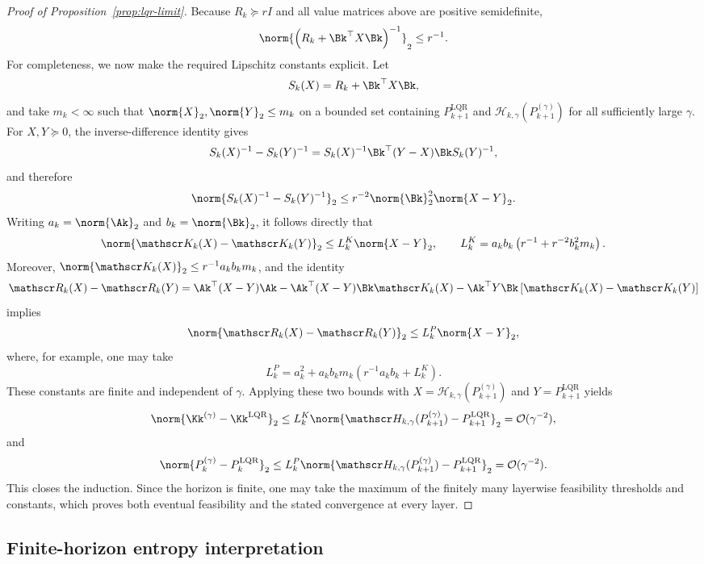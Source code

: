 \begin{proof}[Proof of Proposition~\ref{prop:lqr-limit}]
Because $R_k\succeq rI$ and all value matrices above are positive
semidefinite,
$$
\norm{
\left(R_k+\Bk^\top X\Bk\right)^{-1}
}_2
\leq
r^{-1}.
$$
For completeness, we now make the required Lipschitz constants explicit.
Let
$$
S_k(X)=R_k+\Bk^\top X\Bk,
$$
and take $m_k<\infty$ such that $\norm{X}_2,\norm{Y}_2\leq m_k$ on a bounded
set containing $P_{k+1}^{\mathrm{LQR}}$ and
$\mathscr H_{k,\gamma}(P_{k+1}^{(\gamma)})$ for all sufficiently large
$\gamma$. For $X,Y\succeq0$, the inverse-difference identity gives
$$
S_k(X)^{-1}-S_k(Y)^{-1}
=
S_k(X)^{-1}\Bk^\top(Y-X)\Bk S_k(Y)^{-1},
$$
and therefore
$$
\norm{S_k(X)^{-1}-S_k(Y)^{-1}}_2
\leq
r^{-2}\norm{\Bk}_2^2\norm{X-Y}_2.
$$
Writing $a_k=\norm{\Ak}_2$ and $b_k=\norm{\Bk}_2$, it follows directly that
$$
\norm{\mathscr K_k(X)-\mathscr K_k(Y)}_2
\leq
L_k^K\norm{X-Y}_2,
\qquad
L_k^K
=
a_kb_k\left(r^{-1}+r^{-2}b_k^2m_k\right).
$$
Moreover,
$\norm{\mathscr K_k(X)}_2\leq r^{-1}a_kb_km_k$, and the identity
$$
\mathscr R_k(X)-\mathscr R_k(Y)
=
\Ak^\top(X-Y)\Ak
-\Ak^\top(X-Y)\Bk\mathscr K_k(X)
-\Ak^\top Y\Bk
\left[\mathscr K_k(X)-\mathscr K_k(Y)\right]
$$
implies
$$
\norm{\mathscr R_k(X)-\mathscr R_k(Y)}_2
\leq
L_k^P\norm{X-Y}_2,
$$
where, for example, one may take
$$
L_k^P
=
a_k^2
+a_kb_km_k
\left(r^{-1}a_kb_k+L_k^K\right).
$$
These constants are finite and independent of $\gamma$. Applying these two
bounds with
$X=\mathscr H_{k,\gamma}(P_{k+1}^{(\gamma)})$ and
$Y=P_{k+1}^{\mathrm{LQR}}$ yields
$$
\norm{\Kk^{(\gamma)}-\Kk^{\mathrm{LQR}}}_2
\leq
L_k^K
\norm{
\mathscr H_{k,\gamma}(P_{k+1}^{(\gamma)})
-P_{k+1}^{\mathrm{LQR}}
}_2
=
\mathcal O(\gamma^{-2}),
$$
and
$$
\norm{P_k^{(\gamma)}-P_k^{\mathrm{LQR}}}_2
\leq
L_k^P
\norm{
\mathscr H_{k,\gamma}(P_{k+1}^{(\gamma)})
-P_{k+1}^{\mathrm{LQR}}
}_2
=
\mathcal O(\gamma^{-2}).
$$
This closes the induction.  Since the horizon is finite, one may take the
maximum of the finitely many layerwise feasibility thresholds and constants,
which proves both eventual feasibility and the stated convergence at every
layer.
\end{proof}

\subsection{Finite-horizon entropy interpretation}

